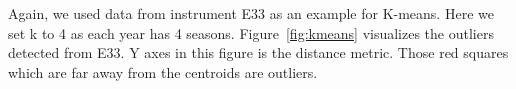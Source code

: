 Again, we used data from instrument E33 as an example for K-means. Here
we set k to 4 as each year has 4 seasons.  Figure~\ref{fig:kmeans}
visualizes the outliers detected from E33. Y axes in this figure is the
distance metric. Those red squares which are far away from the centroids
are outliers.


